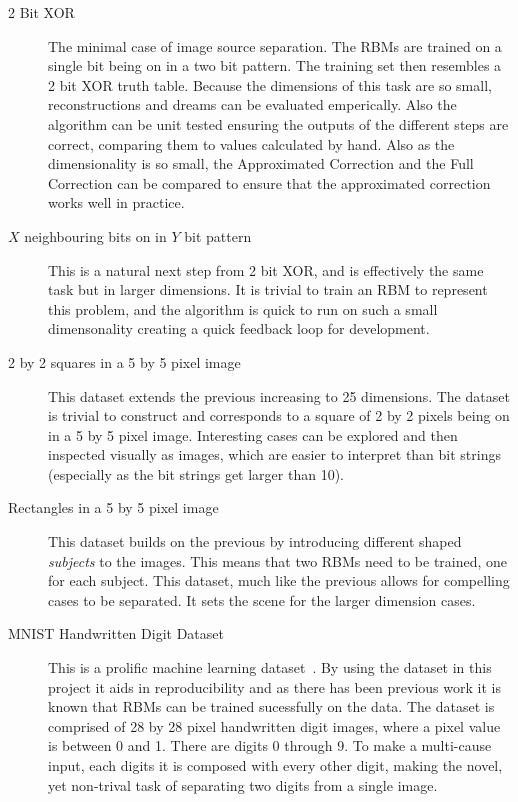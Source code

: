 \begin{description}
  \item[2 Bit XOR] The minimal case of image source separation. The RBMs are trained on a single bit being on in a two bit pattern. The training set then resembles a 2 bit XOR truth table. Because the dimensions of this task are so small, reconstructions and dreams can be evaluated emperically. Also the algorithm can be unit tested ensuring the outputs of the different steps are correct, comparing them to values calculated by hand. Also as the dimensionality is so small, the Approximated Correction and the Full Correction can be compared to ensure that the approximated correction works well in practice.
  \item[$X$ neighbouring bits on in $Y$ bit pattern] This is a natural next step from 2 bit XOR, and is effectively the same task but in larger dimensions. It is trivial to train an RBM to represent this problem, and the algorithm is quick to run on such a small dimensonality creating a quick feedback loop for development.
  \item[2 by 2 squares in a 5 by 5 pixel image] This dataset extends the previous increasing to 25 dimensions. The dataset is trivial to construct and corresponds to a square of 2 by 2 pixels being on in a 5 by 5 pixel image. Interesting cases can be explored and then inspected visually as images, which are easier to interpret than bit strings (especially as the bit strings get larger than 10).
  \item[Rectangles in a 5 by 5 pixel image] This dataset builds on the previous by introducing different shaped \emph{subjects} to the images. This means that two RBMs need to be trained, one for each subject. This dataset, much like the previous allows for compelling cases to be separated. It sets the scene for the larger dimension cases.
  \item[MNIST Handwritten Digit Dataset] This is a prolific machine learning dataset~\cite{mnistlecun}. By using the dataset in this project it aids in reproducibility and as there has been previous work it is known that RBMs can be trained sucessfully on the data. The dataset is comprised of 28 by 28 pixel handwritten digit images, where a pixel value is between 0 and 1. There are digits 0 through 9. To make a multi-cause input, each digits it is composed with every other digit, making the novel, yet non-trival task of separating two digits from a single image.
\end{description}
